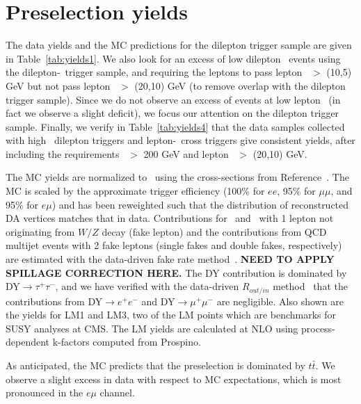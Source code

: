 \section{Preselection yields}
\label{sec:yields}

The data yields and the MC predictions for the dilepton trigger sample are given in Table~\ref{tab:yields1}.
We also look for an excess of low dilepton \pt\ events using the dilepton-\Ht\ trigger sample, and
requiring the leptons to pass lepton \pt\ $>$ (10,5) GeV but not pass lepton \pt\ $>$ (20,10) GeV
(to remove overlap with the dilepton trigger sample). Since we do not observe an excess of
events at low lepton \pt\ (in fact we observe a slight deficit), we focus our attention on the dilepton trigger sample.
Finally, we verify in Table~\ref{tab:yields4} that the data samples collected with high \pt\ dilepton
triggers and lepton-\Ht\ cross triggers give consistent yields, after including the requirements
\Ht\ $>$ 200 GeV and lepton \pt\ $>$ (20,10) GeV.

The MC yields are normalized to \lumi\ using the cross-sections
from Reference~\cite{ref:xsec}. The MC is scaled by the approximate trigger efficiency (100\% for $ee$,
95\% for $\mu\mu$, and 95\% for $e\mu$) and has been reweighted such that the distribution of 
reconstructed DA vertices matches that in data. Contributions for \ttfake\ and \wjets\  
with 1 lepton not originating from $W/Z$ decay (fake lepton) and the contributions from QCD multijet events 
with 2 fake leptons (single fakes and double fakes, respectively) are estimated with the data-driven
fake rate method~\cite{ref:top}. {\color{red} \bf NEED TO APPLY SPILLAGE CORRECTION HERE.}
The DY contribution is dominated by DY$\rightarrow \tau^+\tau^-$,
and we have verified with the data-driven $R_{out/in}$ method~\cite{ref:top} that the
contributions from DY$\to e^{+}e^{-}$ and DY$\to \mu^{+}\mu^{-}$ are negligible.
Also shown are the yields for LM1 and LM3, two of the LM 
points which are benchmarks for SUSY analyses at CMS. The LM yields
are calculated at NLO using process-dependent k-factors computed from Prospino.

As anticipated, the MC predicts that the preselection is dominated by $t\bar{t}$.  
We observe a slight excess in data with respect to MC expectations, which is most pronounced in the $e\mu$ channel.

